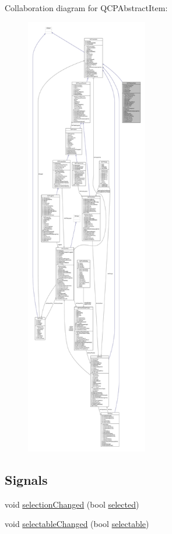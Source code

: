 Collaboration diagram for Q\+C\+P\+Abstract\+Item\+:\nopagebreak
\begin{figure}[H]
\begin{center}
\leavevmode
\includegraphics[height=550pt]{class_q_c_p_abstract_item__coll__graph}
\end{center}
\end{figure}
\subsection*{Signals}
\begin{DoxyCompactItemize}
\item 
void \hyperlink{class_q_c_p_abstract_item_aa5cffb034fc65dbb91c77e02c1c14251}{selection\+Changed} (bool \hyperlink{class_q_c_p_abstract_item_a225865808640d8d9a7dd19f09a2e93f2}{selected})
\item 
void \hyperlink{class_q_c_p_abstract_item_a5b266c11aac61cb511901f3911dac2a3}{selectable\+Changed} (bool \hyperlink{class_q_c_p_abstract_item_a9189e752025533e1595eaade0009a3bc}{selectable})
\end{DoxyCompactItemize}
